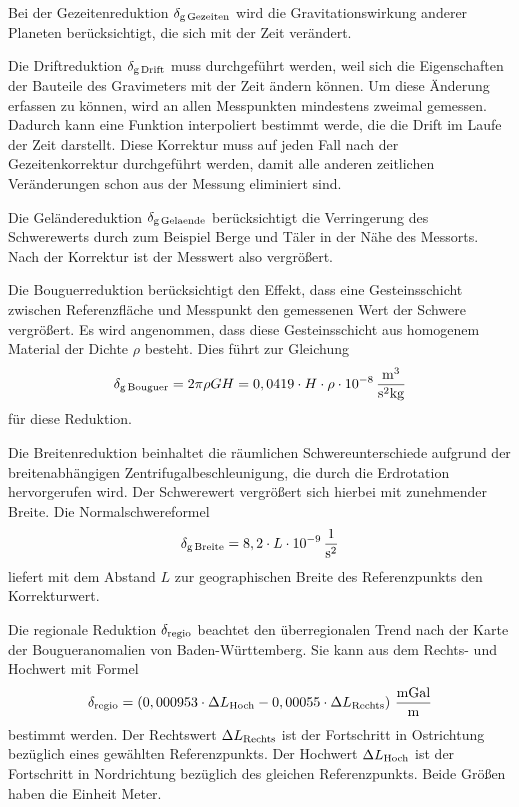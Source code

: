 Bei der Gezeitenreduktion $\delta_{\mathrm{g\,Gezeiten}}$ wird die Gravitationswirkung anderer Planeten berücksichtigt, die sich mit der Zeit verändert.

Die Driftreduktion $\delta_{\mathrm{g\,Drift}}$ muss durchgeführt werden, weil sich die Eigenschaften der Bauteile des Gravimeters mit der Zeit ändern können. Um diese Änderung erfassen zu können, wird an allen Messpunkten mindestens zweimal gemessen. Dadurch kann eine Funktion interpoliert bestimmt werde, die die Drift im Laufe der Zeit darstellt. Diese Korrektur muss auf jeden Fall nach der Gezeitenkorrektur durchgeführt werden, damit alle anderen zeitlichen Veränderungen schon aus der Messung eliminiert sind.

Die Geländereduktion $\delta_{\mathrm{g\,Gelaende}}$ berücksichtigt die Verringerung des Schwerewerts durch zum Beispiel Berge und Täler in der Nähe des Messorts. Nach der Korrektur ist der Messwert also vergrößert.

Die Bouguerreduktion berücksichtigt den Effekt, dass eine Gesteinsschicht zwischen Referenzfläche und Messpunkt den gemessenen Wert der Schwere vergrößert. Es wird angenommen, dass diese Gesteinsschicht aus homogenem Material der Dichte $\rho$ besteht. Dies führt zur Gleichung
\begin{equation}
 \delta_{\mathrm{g\,Bouguer}}=2\pi\rho GH=0,0419\cdot H\cdot\rho\cdot 10^{-8}\,\frac{\mathrm{m^3}}{\mathrm{s^2kg}}
\end{equation}
für diese Reduktion.

Die Breitenreduktion beinhaltet die räumlichen Schwereunterschiede aufgrund der breitenabhängigen Zentrifugalbeschleunigung, die durch die Erdrotation hervorgerufen wird. Der Schwerewert vergrößert sich hierbei mit zunehmender Breite. Die Normalschwereformel
\begin{equation}
 \delta_{\mathrm{g\,Breite}}=8,2\cdot L\cdot 10^{-9}\,\frac{\mathrm{1}}{\mathrm{s^2}}
\end{equation}
liefert mit dem Abstand $L$ zur geographischen Breite des Referenzpunkts den Korrekturwert.

Die regionale Reduktion $\delta_{\mathrm{regio}}$ beachtet den überregionalen Trend nach der Karte der Bougueranomalien von Baden-Württemberg. Sie kann aus dem Rechts- und Hochwert mit Formel
\begin{equation}
 \delta_{\mathrm{regio}}=\left( 0,000953\cdot \Delta L_{\mathrm{Hoch}} - 0,00055 \cdot \Delta L_{\mathrm{Rechts}} \right) \,\frac{\mathrm{mGal}}{\mathrm{m}}
\end{equation}
bestimmt werden. Der Rechtswert $\Delta L_{\mathrm{Rechts}}$ ist der Fortschritt in Ostrichtung bezüglich eines gewählten Referenzpunkts.
Der Hochwert $\Delta L_{\mathrm{Hoch}}$ ist der Fortschritt in Nordrichtung bezüglich des gleichen Referenzpunkts. Beide Größen haben die Einheit Meter.

